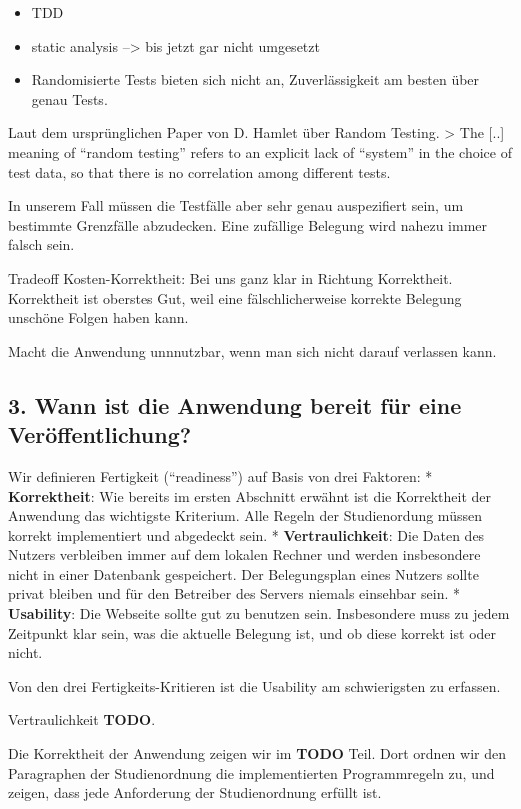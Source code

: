 \documentclass[ngerman]{article}
\begin{document}
\begin{itemize}
\item
  TDD
\item
  static analysis --\textgreater{} bis jetzt gar nicht umgesetzt
\item
  Randomisierte Tests bieten sich nicht an, Zuverlässigkeit am besten
  über genau Tests.
\end{itemize}

Laut dem ursprünglichen Paper von D. Hamlet über Random Testing.
\textgreater{} The {[}..{]} meaning of ``random testing'' refers to an
explicit lack of ``system'' in the choice of test data, so that there is
no correlation among different tests.

In unserem Fall müssen die Testfälle aber sehr genau auspezifiert sein,
um bestimmte Grenzfälle abzudecken. Eine zufällige Belegung wird nahezu
immer falsch sein.

Tradeoff Kosten-Korrektheit: Bei uns ganz klar in Richtung Korrektheit.
Korrektheit ist oberstes Gut, weil eine fälschlicherweise korrekte
Belegung unschöne Folgen haben kann.

Macht die Anwendung unnnutzbar, wenn man sich nicht darauf verlassen
kann.

\subsection{3. Wann ist die Anwendung bereit für eine
Veröffentlichung?}\label{wann-ist-die-anwendung-bereit-fuxfcr-eine-veruxf6ffentlichung}

Wir definieren Fertigkeit (``readiness'') auf Basis von drei Faktoren: *
\textbf{Korrektheit}: Wie bereits im ersten Abschnitt erwähnt ist die
Korrektheit der Anwendung das wichtigste Kriterium. Alle Regeln der
Studienordung müssen korrekt implementiert und abgedeckt sein. *
\textbf{Vertraulichkeit}: Die Daten des Nutzers verbleiben immer auf dem
lokalen Rechner und werden insbesondere nicht in einer Datenbank
gespeichert. Der Belegungsplan eines Nutzers sollte privat bleiben und
für den Betreiber des Servers niemals einsehbar sein. *
\textbf{Usability}: Die Webseite sollte gut zu benutzen sein.
Insbesondere muss zu jedem Zeitpunkt klar sein, was die aktuelle
Belegung ist, und ob diese korrekt ist oder nicht.

Von den drei Fertigkeits-Kritieren ist die Usability am schwierigsten zu
erfassen.

Vertraulichkeit \textbf{TODO}.

Die Korrektheit der Anwendung zeigen wir im \textbf{TODO} Teil. Dort
ordnen wir den Paragraphen der Studienordnung die implementierten
Programmregeln zu, und zeigen, dass jede Anforderung der Studienordnung
erfüllt ist.
\end{document}
